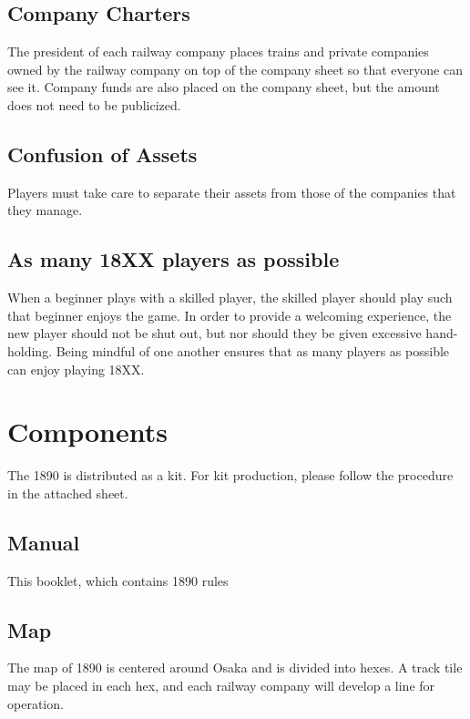 \documentclass{article}
\begin{document}
\begin{CJK}{UTF8}{min}
\begin{multicols}{2}
\subsection{Company Charters}
\label{company-charters}
The president of each railway company places trains and private
companies owned by the railway company on top of the company sheet so
that everyone can see it. Company funds are also placed on the company
sheet, but the amount does not need to be publicized.


\subsection{Confusion of Assets}
Players must take care to separate their assets from those of the
companies that they manage.


\subsection{As many 18XX players as possible}
When a beginner plays with a skilled player, the skilled player should
play such that beginner enjoys the game. In order to provide a
welcoming experience, the new player should not be shut out, but nor
should they be given excessive hand-holding. Being mindful of one
another ensures that as many players as possible can enjoy playing
18XX.


\section{Components}
The 1890 is distributed as a kit. For kit production, please follow
the procedure in the attached sheet.

\subsection{Manual}
This booklet, which contains 1890 rules

\subsection{Map}
The map of 1890 is centered around Osaka and is divided into
hexes. A track tile may be placed in each hex, and each
railway company will develop a line for operation.


\end{multicols}
\end{CJK}
\end{document}
